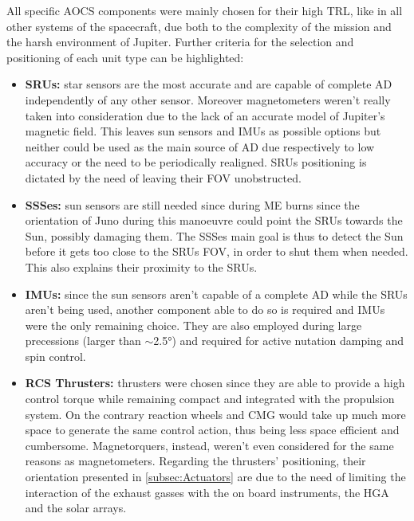 All specific AOCS components were mainly chosen for their high TRL, like in all other systems of the spacecraft, due both to the complexity of the mission and the harsh environment of Jupiter. Further criteria for the selection and positioning of each unit type can be highlighted:
\begin{itemize}
    \item \textbf{SRUs:} star sensors are the most accurate and are capable of complete AD independently of any other sensor. Moreover magnetometers weren't really taken into consideration due to the lack of an accurate model of Jupiter's magnetic field. This leaves sun sensors and IMUs as possible options but neither could be used as the main source of AD due respectively to low accuracy or the need to be periodically realigned. SRUs positioning is dictated by the need of leaving their FOV unobstructed.
    \item \textbf{SSSes:} sun sensors are still needed since during ME burns since the orientation of Juno during this manoeuvre could point the SRUs towards the Sun, possibly damaging them. The SSSes main goal is thus to detect the Sun before it gets too close to the SRUs FOV, in order to shut them when needed. This also explains their proximity to the SRUs.
    \item \textbf{IMUs:} since the sun sensors aren't capable of a complete AD while the SRUs aren't being used, another component able to do so is required and IMUs were the only remaining choice. They are also employed during large precessions (larger than $\sim$2.5°) and required for active nutation damping and spin control.
    \item \textbf{RCS Thrusters:} thrusters were chosen since they are able to provide a high control torque while remaining compact and integrated with the propulsion system. On the contrary reaction wheels and CMG would take up much more space to generate the same control action, thus being less space efficient and cumbersome. Magnetorquers, instead, weren't even considered for the same reasons as magnetometers. Regarding the thrusters' positioning, their orientation presented in \autoref{subsec:Actuators} are due to the need of limiting the interaction of the exhaust gasses with the on board instruments, the HGA and the solar arrays.     
\end{itemize}  
